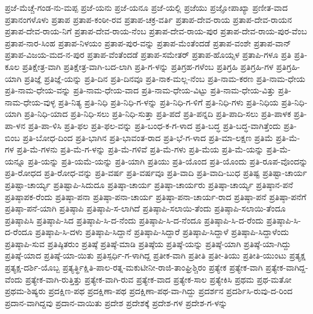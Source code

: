 ಪ್ರಜೆ-ಮೆಚ್ಚೆ-ಗಂಡ-ನು-ಮಪ್ಪ
ಪ್ರಜೆ-ಯನು
ಪ್ರಜೆ-ಯನೂ
ಪ್ರಜೆ-ಯಲ್ಲಿ
ಪ್ರಜೆಯು
ಪ್ರಜ್ಞೋಪಾಖ್ಯಾ
ಪ್ರಣೀತ-ವಾದ
ಪ್ರತಾನಂಗಳೊಳು
ಪ್ರತಾಪ
ಪ್ರತಾಪ-ಕಂಠೀ-ರವ
ಪ್ರತಾಪ-ಚಕ್ರ-ವರ್ತಿ
ಪ್ರತಾಪ-ದೇವ-ರಾಯ
ಪ್ರತಾಪ-ದೇವ-ರಾಯನ
ಪ್ರತಾಪ-ದೇವ-ರಾಯ-ನಿಗೆ
ಪ್ರತಾಪ-ದೇವ-ರಾಯ-ನೆಂಬ
ಪ್ರತಾಪ-ದೇವ-ರಾಯ-ಪುರ
ಪ್ರತಾಪ-ದೇವ-ರಾಯ-ಪುರ-ವೆಂಬ
ಪ್ರತಾಪ-ನಾರ-ಸಿಂಹ
ಪ್ರತಾಪ-ನಿಳಯಂ
ಪ್ರತಾಪ-ಪುರ-ವನ್ನು
ಪ್ರತಾಪ-ಮೆಂತೆಂದಡೆ
ಪ್ರತಾಪ-ವಂಶೇ
ಪ್ರತಾಪ-ವಾನ್
ಪ್ರತಾಪ-ವಿಜಯ-ಮದ-ನ-ಪುರ
ಪ್ರತಾಪ-ವೆಂತೆಂದಡೆ
ಪ್ರತಾಪ-ಸಮೇತರ್
ಪ್ರತಾಪ-ಹೊಯ್ಸಳ
ಪ್ರತಾಪಿ-ಗಳೂ
ಪ್ರತಿ
ಪ್ರತಿ-ಕೂಲ
ಪ್ರತಿಕ್ಷೇತ್ರ-ವಾಗಿ
ಪ್ರತಿಕ್ಷೇತ್ರ-ವಾಗಿ-ಬದ-ಲಾಗಿ
ಪ್ರತಿ-ಗ-ಳನ್ನು
ಪ್ರತಿಗ್ರಹ-ಗಳೆಂಬ
ಪ್ರತಿಗ್ರಹಿ
ಪ್ರತಿಗ್ರಹಿ-ಗಳ
ಪ್ರತಿಗ್ರಹಿ-ಯಾಗಿ
ಪ್ರತಿಜ್ಞೆ
ಪ್ರತಿಜ್ಞೆ-ಯನ್ನು
ಪ್ರತಿ-ದಿನ
ಪ್ರತಿ-ದಿನವೂ
ಪ್ರತಿ-ನಾಕ-ಮಲ್ಲ-ನೆಂಬ
ಪ್ರತಿ-ನಾಮ-ಕರಣ
ಪ್ರತಿ-ನಾಮ-ಧೇಯ
ಪ್ರತಿ-ನಾಮ-ಧೇಯ-ವನ್ನು
ಪ್ರತಿ-ನಾಮ-ಧೇಯ-ವಾದ
ಪ್ರತಿ-ನಾಮ-ಧೇಯ-ವಿಟ್ಟು
ಪ್ರತಿ-ನಾಮ-ಧೇಯ-ವಿತ್ತು
ಪ್ರತಿ-ನಾಮ-ಧೇಯ-ವುಳ್ಳ
ಪ್ರತಿ-ನಿತ್ಯ
ಪ್ರತಿ-ನಿಧಿ
ಪ್ರತಿ-ನಿಧಿ-ಗ-ಳನ್ನು
ಪ್ರತಿ-ನಿಧಿ-ಗ-ಳಿಗೆ
ಪ್ರತಿ-ನಿಧಿ-ಗಳು
ಪ್ರತಿ-ನಿಧಿಯ
ಪ್ರತಿ-ನಿಧಿ-ಯಾಗಿ
ಪ್ರತಿ-ನಿಧಿ-ಯಾದ
ಪ್ರತಿ-ನಿಧಿ-ಸಲು
ಪ್ರತಿ-ನಿಧಿ-ಸುತ್ತಾ
ಪ್ರತಿ-ಪದೆ
ಪ್ರತಿ-ಪನ್ನದಿ
ಪ್ರತಿ-ಪಾದಿ-ಸಲು
ಪ್ರತಿ-ಪಾಳಕ
ಪ್ರತಿ-ಪಾ-ಳನ
ಪ್ರತಿ-ಪಾ-ಳಿಸಿ
ಪ್ರತಿ-ಫಲ
ಪ್ರತಿ-ಫಲ-ವನ್ನು
ಪ್ರತಿ-ಬಂಧ-ಕ-ಗ-ಳಾದ
ಪ್ರತಿ-ಬದ್ಧ
ಪ್ರತಿ-ಬದ್ಧ-ವಾಗಿತ್ತೆಂದು
ಪ್ರತಿ-ಬಿಂಬ
ಪ್ರತಿ-ಬೋಧ-ದಿಂದ
ಪ್ರತಿ-ಭಾಗಿನ
ಪ್ರತಿ-ಭಾವಂತ-ರಾದ
ಪ್ರತಿ-ಭೆ-ಗ-ಳಾದ
ಪ್ರತಿ-ಮಾ-ಲಕ್ಷಣ
ಪ್ರತಿಮೆ
ಪ್ರತಿ-ಮೆ-ಗಳ
ಪ್ರತಿ-ಮೆ-ಗಳನು
ಪ್ರತಿ-ಮೆ-ಗ-ಳನ್ನು
ಪ್ರತಿ-ಮೆ-ಗಳಿವೆ
ಪ್ರತಿ-ಮೆ-ಗಳು
ಪ್ರತಿ-ಮೆಯ
ಪ್ರತಿ-ಮೆ-ಯನ್ನು
ಪ್ರತಿ-ಮೆ-ಯನ್ನೂ
ಪ್ರತಿ-ಯನ್ನು
ಪ್ರತಿ-ಯಮೆ-ಯನ್ನು
ಪ್ರತಿ-ಯಾಗಿ
ಪ್ರತಿಯು
ಪ್ರತಿ-ಯೊಂದ
ಪ್ರತಿ-ಯೊಂದು
ಪ್ರತಿ-ರೂಪ-ವೊಂದನ್ನು
ಪ್ರತಿ-ರೋಧದ
ಪ್ರತಿ-ರೋಧ-ವನ್ನು
ಪ್ರತಿ-ವರ್ಷ
ಪ್ರತಿ-ವರ್ಷವೂ
ಪ್ರತಿ-ವಾದಿ
ಪ್ರತಿ-ವಾದಿ-ಬುಧ
ಪ್ರತಿಷ್ಟ
ಪ್ರತಿಷ್ಟಾ-ಚಾರ್ಯ
ಪ್ರತಿಷ್ಟಾ-ಚಾರ್ಯ್ಯ
ಪ್ರತಿಷ್ಟಾಪಿ-ಸಿದುದೂ
ಪ್ರತಿಷ್ಠಾ-ಚಾರ್ಯ
ಪ್ರತಿಷ್ಠಾ-ಚಾರ್ಯರು
ಪ್ರತಿಷ್ಠಾ-ಚಾರ್ಯ್ಯ
ಪ್ರತಿಷ್ಠಾನ-ಪನೆ
ಪ್ರತಿಷ್ಠಾಪಕ-ರೆಂದು
ಪ್ರತಿಷ್ಠಾ-ಪನಾ
ಪ್ರತಿಷ್ಠಾ-ಪನಾ-ಚಾರ್ಯ
ಪ್ರತಿಷ್ಠಾ-ಪನಾ-ಚಾರ್ಯ-ರಾದ
ಪ್ರತಿಷ್ಠಾ-ಪನೆ
ಪ್ರತಿಷ್ಠಾ-ಪನೆಗೆ
ಪ್ರತಿಷ್ಠಾ-ಪನೆ-ಯಾಗಿ
ಪ್ರತಿಷ್ಠಾಪಿ
ಪ್ರತಿಷ್ಠಾಪಿ-ಸ-ಲಾಗಿದೆ
ಪ್ರತಿಷ್ಠಾಪಿ-ಸಲಾಯಿ-ತೆಂದು
ಪ್ರತಿಷ್ಠಾಪಿ-ಸಲಾಯಿ-ತೆಂದೂ
ಪ್ರತಿಷ್ಠಾಪಿಸಿ
ಪ್ರತಿಷ್ಠಾಪಿ-ಸಿದ
ಪ್ರತಿಷ್ಠಾಪಿ-ಸಿ-ದ-ನೆಂದು
ಪ್ರತಿಷ್ಠಾಪಿ-ಸಿ-ದ-ನೆಂದೂ
ಪ್ರತಿಷ್ಠಾಪಿ-ಸಿ-ದ-ರೆಂದು
ಪ್ರತಿಷ್ಠಾಪಿ-ಸಿ-ದ-ರೆಂದೂ
ಪ್ರತಿಷ್ಠಾಪಿ-ಸಿ-ದಳು
ಪ್ರತಿಷ್ಠಾಪಿ-ಸಿದ್ದಾನೆ
ಪ್ರತಿಷ್ಠಾಪಿ-ಸಿದ್ದಾರೆ
ಪ್ರತಿಷ್ಠಾಪಿ-ಸಿದ್ದಾಳೆ
ಪ್ರತಿಷ್ಠಾಪಿ-ಸಿದ್ದಾಳೆಂದು
ಪ್ರತಿಷ್ಠಾಪಿ-ಸುವ
ಪ್ರತಿಷ್ಠಿತರುಂ
ಪ್ರತಿಷ್ಠೆ
ಪ್ರತಿಷ್ಠೆ-ಮಾಡಿ
ಪ್ರತಿಷ್ಠೆಯ
ಪ್ರತಿಷ್ಠೆ-ಯನ್ನು
ಪ್ರತಿಷ್ಠೆ-ಯಾಗಿ
ಪ್ರತಿಷ್ಠೆ-ಯಾ-ಗಿದ್ದು
ಪ್ರತಿಷ್ಠೆ-ಯಾದ
ಪ್ರತಿಷ್ಠೆ-ಯಾ-ಯಿತು
ಪ್ರತಿಸ್ಪರ್ಧಿ-ಗ-ಳಾಗಿದ್ದ
ಪ್ರತೀಕ-ವಾಗಿ
ಪ್ರತೀತಿ
ಪ್ರತೀ-ತಿಯು
ಪ್ರತೀತಿ-ಯುಂಟು
ಪ್ರತ್ಯಕ್ಷ
ಪ್ರತ್ಯಕ್ಷ-ದರ್ಶಿ-ಯೊಬ್ಬ
ಪ್ರತ್ಯರ್ತ್ಥಿಕ್ಷಿತಿ-ಪಾಲ-ರತ್ನ-ಮಕುಟೀನೀ-ರಾಜಿ-ತಾಂಘ್ರಿಶ್ಚಿರಂ
ಪ್ರತ್ಯೇಕ
ಪ್ರತ್ಯೇಕ-ವಾಗಿ
ಪ್ರತ್ಯೇಕ-ವಾಗಿದ್ದ-ವೆಂದು
ಪ್ರತ್ಯೇಕ-ವಾಗಿ-ರುತ್ತಿತ್ತು
ಪ್ರತ್ಯೇಕ-ವಾಗಿ-ರುವ
ಪ್ರತ್ಯೇಕ-ವಾದ
ಪ್ರತ್ಯೇಕ-ಸಾಲ
ಪ್ರತ್ಯೇಕಿಸಿ
ಪ್ರಥಮ
ಪ್ರಥ-ಮತೋ
ಪ್ರಥಮ-ಶಿಷ್ಯರು
ಪ್ರದಕ್ಷಿಣ-ಪಥ
ಪ್ರದಕ್ಷಿಣಾ-ಪಥ
ಪ್ರದಕ್ಷಿಣಾ-ಪಥ-ವಾ-ಗಿದ್ದು
ಪ್ರದರ್ಶನ
ಪ್ರದರ್ಶಿಸಿ-ರುವು-ದ-ರಿಂದ
ಪ್ರದಾನ-ವಾಗಿದ್ದವು
ಪ್ರದಾನ-ವಾಯಿತು
ಪ್ರದೇಶ
ಪ್ರದೇಶಕ್ಕೆ
ಪ್ರದೇಶ-ಗಳ
ಪ್ರದೇಶ-ಗ-ಳನ್ನು
